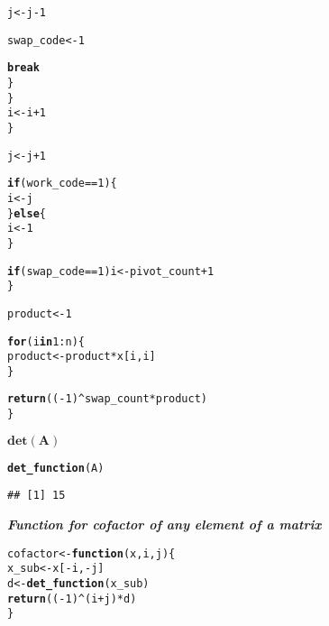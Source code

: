 \documentclass[11pt, a4paper]{article}\usepackage[]{graphicx}\usepackage[]{xcolor}
\makeatletter
\newcommand{\hlnum}[1]{\textcolor[rgb]{0.686,0.059,0.569}{#1}}%
\newcommand{\hlopt}[1]{\textcolor[rgb]{0,0,0}{#1}}%
\newcommand{\hldef}[1]{\textcolor[rgb]{0.345,0.345,0.345}{#1}}%
\newcommand{\hlkwa}[1]{\textcolor[rgb]{0.161,0.373,0.58}{\textbf{#1}}}%
\newcommand{\hlkwb}[1]{\textcolor[rgb]{0.69,0.353,0.396}{#1}}%
\newcommand{\hlkwc}[1]{\textcolor[rgb]{0.333,0.667,0.333}{#1}}%
\newcommand{\hlkwd}[1]{\textcolor[rgb]{0.737,0.353,0.396}{\textbf{#1}}}%
\newenvironment{kframe}{%
 \def\at@end@of@kframe{}%
 \ifinner\ifhmode%
  \def\at@end@of@kframe{\end{minipage}}%
  \begin{minipage}{\columnwidth}%
 \fi\fi%
 \def\FrameCommand##1{\hskip\@totalleftmargin \hskip-\fboxsep
 \colorbox{shadecolor}{##1}\hskip-\fboxsep
     \hskip-\linewidth \hskip-\@totalleftmargin \hskip\columnwidth}%
 \MakeFramed {\advance\hsize-\width
   \@totalleftmargin\z@ \linewidth\hsize
   \@setminipage}}%
 {\par\unskip\endMakeFramed%
 \at@end@of@kframe}
\newenvironment{knitrout}{}{} %
\makeatother
\begin{document}
\begin{knitrout}
\begin{kframe}
\begin{alltt}
          \hldef{j} \hlkwb{<-} \hldef{j} \hlopt{-} \hlnum{1}

          \hldef{swap_code} \hlkwb{<-} \hlnum{1}

          \hlkwa{break}
        \hldef{\}}
      \hldef{\}}
      \hldef{i} \hlkwb{<-} \hldef{i} \hlopt{+} \hlnum{1}
    \hldef{\}}

    \hldef{j} \hlkwb{<-} \hldef{j} \hlopt{+} \hlnum{1}

    \hlkwa{if}\hldef{(work_code} \hlopt{==} \hlnum{1}\hldef{) \{}
      \hldef{i} \hlkwb{<-} \hldef{j}
    \hldef{\}} \hlkwa{else} \hldef{\{}
      \hldef{i} \hlkwb{<-} \hlnum{1}
    \hldef{\}}

    \hlkwa{if}\hldef{(swap_code} \hlopt{==} \hlnum{1}\hldef{) i} \hlkwb{<-} \hldef{pivot_count} \hlopt{+} \hlnum{1}
  \hldef{\}}

  \hldef{product} \hlkwb{<-} \hlnum{1}

  \hlkwa{for} \hldef{(i} \hlkwa{in} \hlnum{1}\hlopt{:}\hldef{n) \{}
    \hldef{product} \hlkwb{<-} \hldef{product} \hlopt{*} \hldef{x[i, i]}
  \hldef{\}}

  \hlkwd{return}\hldef{((}\hlopt{-}\hlnum{1}\hldef{)}\hlopt{^}\hldef{swap_count} \hlopt{*} \hldef{product)}
\hldef{\}}
\end{alltt}
\end{kframe}
\end{knitrout}

\faArrowAltCircleRight[regular] $\mathbf{det(A)}$

\begin{knitrout}
\color{fgcolor}\begin{kframe}
\begin{alltt}
\hlkwd{det_function}\hldef{(A)}
\end{alltt}
\begin{verbatim}
## [1] 15
\end{verbatim}
\end{kframe}
\end{knitrout}

\faArrowAltCircleRight[regular] \textit{\textbf{Function for cofactor of any element of a matrix}}

\begin{knitrout}
\color{fgcolor}\begin{kframe}
\begin{alltt}
\hldef{cofactor} \hlkwb{<-} \hlkwa{function}\hldef{(}\hlkwc{x}\hldef{,} \hlkwc{i}\hldef{,} \hlkwc{j}\hldef{)\{}
  \hldef{x_sub} \hlkwb{<-} \hldef{x[}\hlopt{-}\hldef{i,} \hlopt{-}\hldef{j]}
  \hldef{d} \hlkwb{<-} \hlkwd{det_function}\hldef{(x_sub)}
  \hlkwd{return}\hldef{((}\hlopt{-}\hlnum{1}\hldef{)}\hlopt{^}\hldef{(i}\hlopt{+}\hldef{j)} \hlopt{*} \hldef{d)}
\hldef{\}}
\end{alltt}
\end{kframe}
\end{knitrout}
\end{document}

